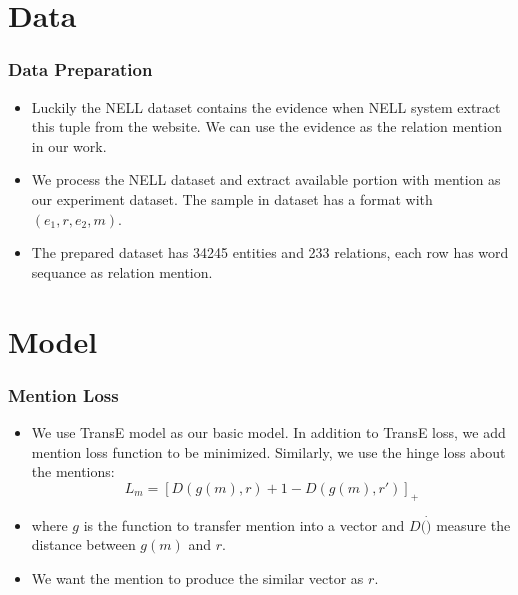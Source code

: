 \documentclass[pdf,10pt]{beamer}
\begin{document}
\section{Data}
\begin{frame}
\frametitle{Data Preparation}
    \begin{itemize}
        \item Luckily the NELL dataset contains the evidence when NELL system extract this tuple from the website. We can use the evidence as the relation mention in our work.
        \item We process the NELL dataset and extract available portion with mention as our experiment dataset. The sample in dataset has a format with $(e_1, r, e_2, m)$.
        \item The prepared  dataset has 34245 entities and 233 relations, each row has word sequance as relation mention.
    \end{itemize}
\end{frame}

\section{Model}
\begin{frame}
    \frametitle{Mention Loss}
    \begin{itemize}
        \item We use TransE model as our basic model. In addition to TransE loss, we add mention loss function to be minimized. Similarly, we use the hinge loss about the mentions:
            $$L_m=[D(g(m), r) + 1 - D(g(m), r')]_+$$
        \item where $g$ is the function to transfer mention into a vector and $D(\dot)$ measure the distance between $g(m)$ and $r$. 
        \item We want the mention to produce the similar vector as $r$. 
    \end{itemize}
\end{frame}
\end{document}
